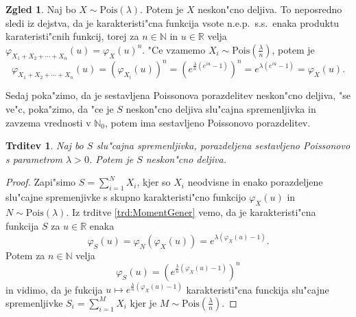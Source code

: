 \documentclass[12pt, a4paper, reqno]{amsart}
\theoremstyle{definition}
\newtheorem{zgled}[definicija]{Zgled}
\theoremstyle{plain}
\newtheorem{trditev}[definicija]{Trditev}
\newcommand{\R}{\mathbb{R}}
\newcommand{\N}{\mathbb{N}}
\newcommand{\1}{\mathds{1}}
\newcommand{\Pois}[1]{\text{Pois}(#1)}
\begin{document}
    \begin{zgled}
        Naj bo $X\sim \text{Pois}(\lambda)$. Potem je $X$ neskon"cno deljiva. To neposredno sledi 
        iz dejstva, da je karakteristi"cna funkcija vsote n.e.p.\ s.s.\ enaka produktu karateristi"cnih 
        funkcij, torej za $n\in\N$ in $u\in\R$ velja $\varphi_{X_1 + X_2 + \cdots + X_n}(u) = \varphi_X(u)^n$. 
        "Ce vzamemo $X_i \sim \text{Pois}(\tfrac{\lambda}{n})$, potem je 
        \begin{equation*}
        \varphi_{X_1 + X_2 + \cdots + X_n}(u) = 
        \left(\varphi_{X_i}(u)\right)^n = \left(e^{\tfrac{\lambda}{n}(e^{iu} - 1)}\right)^n = e^{\lambda(e^{iu} - 1)} = \varphi_X(u).
        \end{equation*}
    \end{zgled}

    Sedaj poka"zimo, da je sestavljena Poissonova porazdelitev neskon"cno deljiva, "se ve"c, poka"zimo, 
    da "ce je $S$ neskon"cno deljiva slu"cajna spremenljivka in zavzema vrednosti v $\N_0$, 
    potem ima sestavljeno Poissonovo porazdelitev.

    \begin{trditev}
        Naj bo $S$ slu"cajna spremenljivka, porazdeljena sestavljeno Poissonovo s parametrom $\lambda > 0$.
        Potem je $S$ neskon"cno deljiva.
        \label{trd:CPDneskoncnoDeljiva}
    \end{trditev}

    \begin{proof}
        Zapi"simo $S = \sum_{i=1}^NX_i$, kjer so $X_i$ neodvisne in enako porazdeljene slu"cajne 
        spremenjivke s skupno karakteristi"cno funkcijo $\varphi_X(u)$ in $N\sim\Pois{\lambda}$. Iz 
        trditve \ref{trd:MomentGener} vemo, da je karakteristi"cna funkcija $S$ za $u\in \R$ enaka
        \begin{equation*}
            \varphi_S(u) = \varphi_N\left(\varphi_X(u)\right) = e^{\lambda\left(\varphi_X(u) - 1\right)}.
        \end{equation*}
        Potem za $n\in\N$ velja
        \begin{equation*}
            \varphi_{S}(u) = \left(e^{\frac{\lambda}{n}\left(\varphi_X(u) - 1\right)}\right)^n
        \end{equation*}
        in vidimo, da je fukcija $u\mapsto e^{\frac{\lambda}{n}\left(\varphi_X(u) - 1\right)}$ karakteristi"cna
        funckija slu"cajne spremenljivke $S_i = \sum_{i = 1}^MX_i$ kjer je $M\sim\Pois{\tfrac{\lambda}{n}}$.
    \end{proof}
\end{document}
